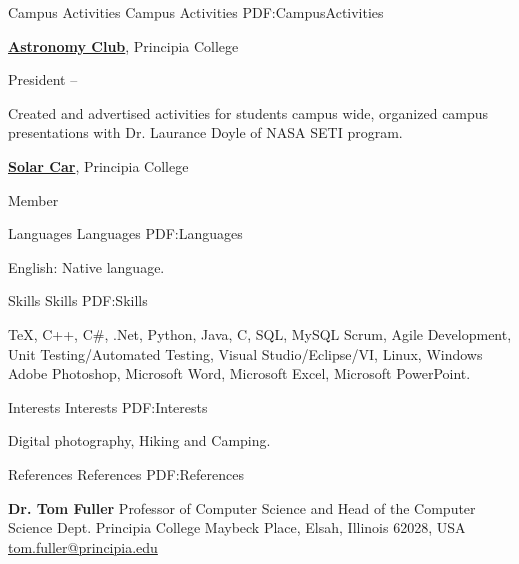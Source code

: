 \documentclass[a4paper,MMMyyyy,nonstopmode]{simpleresumecv}
\begin{document}
\begin{Body}




\Section
{Campus Activities}
{Campus Activities}
{PDF:CampusActivities}

\Entry
\href{http://www.example.com/my-club}
{\textbf{Astronomy Club}},
Principia College

\Gap
\BulletItem
President
\hfill
{} --
\begin{Detail}
\SubBulletItem
Created and advertised activities for students campus wide, organized campus presentations with Dr. Laurance Doyle of NASA SETI program.

\Entry
\Gap
\href{https://www.principiasolarcar.com/}
{\textbf{Solar Car}},
Principia College

\BulletItem
Member
\end{Detail}


\Section
{Languages}
{Languages}
{PDF:Languages}

\BulletItem
English: Native language.


\Section
{Skills}
{Skills}
{PDF:Skills}

\Entry
{\TeX},
C++,
C\#,
.Net,
Python,
Java,
C,
SQL, MySQL
Scrum,
Agile Development,
Unit Testing/Automated Testing,
Visual Studio/Eclipse/VI,
Linux, Windows
Adobe Photoshop,
Microsoft Word,
Microsoft Excel,
Microsoft PowerPoint.


\Section
{Interests}
{Interests}
{PDF:Interests}

\Entry
Digital photography,
Hiking and Camping.


\Section
{References}
{References}
{PDF:References}

\BulletItem
\textbf{Dr. Tom Fuller}
\newline
Professor of Computer Science and Head of the Computer Science Dept.
\newline
Principia College
 Maybeck Place, Elsah, Illinois 62028, USA
\newline
\href{mailto:tom.fuller@principia.edu}
{tom.fuller@principia.edu}

\end{Body}
\end{document}
